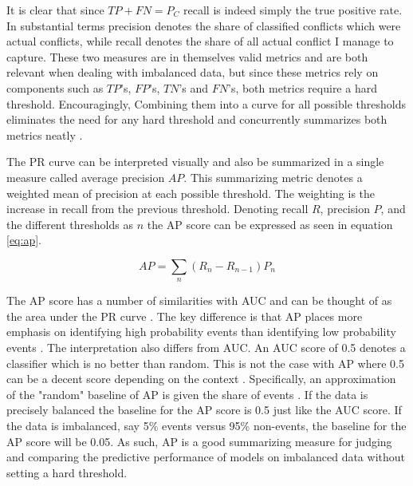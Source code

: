 \documentclass[a4paper]{article}
\begin{document}
It is clear that since $TP+FN = P_C$ recall is indeed simply the true positive rate. In substantial terms precision denotes the share of classified conflicts which were actual conflicts, while recall denotes the share of all actual conflict I manage to capture. These two measures are in themselves valid metrics and are both relevant when dealing with imbalanced data, but since these metrics rely on components such as $TP$'s, $FP$'s, $TN$'s and $FN$'s, both metrics require a hard threshold. Encouragingly, Combining them into a curve for all possible thresholds eliminates the need for any hard threshold and concurrently summarizes both metrics neatly \citep[1287]{He_2008}.\par

The PR curve can be interpreted visually and also be summarized in a single measure called average precision $AP$. This summarizing metric denotes a weighted mean of precision at each possible threshold. The weighting is the increase in recall from the previous threshold. Denoting recall $R$, precision $P$, and the different thresholds as $n$ the AP score can be expressed as seen in equation \ref{eq:ap}.\par

\[
AP = \sum_n (R_n-R_{n-1})P_n \tag{17} \label{eq:ap}
\]

The AP score has a number of similarities with AUC and can be thought of as the area under the PR curve  \citep[349-350]{su2015relationship}. The key difference is that AP places more emphasis on identifying high probability events than identifying low probability events \citep[350]{su2015relationship}. The interpretation also differs from AUC. An AUC score of 0.5 denotes a classifier which is no better than random. This is not the case with AP where 0.5 can be a decent score depending on the context \citep[350-351]{su2015relationship}. Specifically, an approximation of the "random" baseline of AP is given the share of events \citep[132]{bestgen2015AP}. If the data is precisely balanced the baseline for the AP score is 0.5 just like the AUC score. If the data is imbalanced, say 5\% events versus 95\% non-events, the baseline for the AP score will be 0.05. As such, AP is a good summarizing measure for judging and comparing the predictive performance of models on imbalanced data without setting a hard threshold.\par

\end{document}
